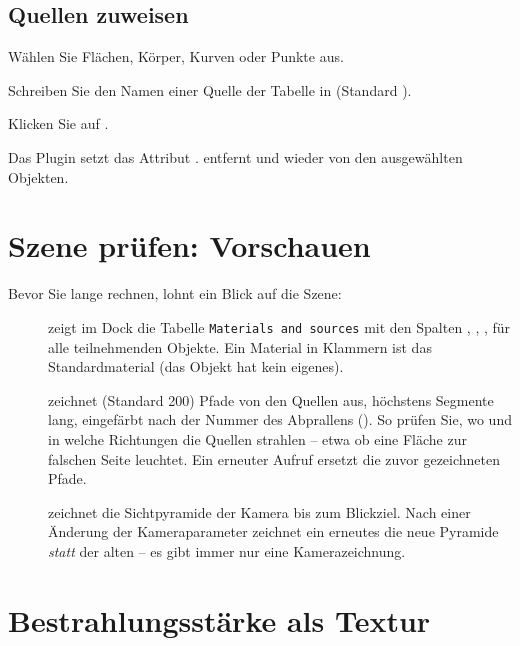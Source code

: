 \subsection{Quellen zuweisen}

\begin{schritte}
  \item Wählen Sie Flächen, Körper, Kurven oder Punkte aus.
  \item Schreiben Sie den Namen einer Quelle der Tabelle in 
    (Standard ).
  \item Klicken Sie auf .
\end{schritte}

Das Plugin setzt das Attribut .  entfernt
 und  wieder von den ausgewählten Objekten.

\section{Szene prüfen: Vorschauen}\label{sec:pt-vorschau}

Bevor Sie lange rechnen, lohnt ein Blick auf die Szene:

\begin{description}
  \item[] zeigt im Dock  die Tabelle
    \texttt{Materials and sources} mit den Spalten , , ,
     für alle teilnehmenden Objekte. Ein Material in Klammern ist das Standardmaterial
    (das Objekt hat kein eigenes).
  \item[] zeichnet  (Standard 200) Pfade von den
    Quellen aus, höchstens  Segmente lang, eingefärbt nach der Nummer des
    Abprallens (). So prüfen Sie, wo und in welche Richtungen die Quellen strahlen
    -- etwa ob eine Fläche zur falschen Seite leuchtet. Ein erneuter Aufruf ersetzt die zuvor
    gezeichneten Pfade.
  \item[] zeichnet die Sichtpyramide der Kamera bis zum Blickziel. Nach einer
    Änderung der Kameraparameter zeichnet ein erneutes  die neue Pyramide
    \emph{statt} der alten -- es gibt immer nur eine Kamerazeichnung.
\end{description}

\section{Bestrahlungsstärke als Textur}\label{sec:pt-bestrahlung}

